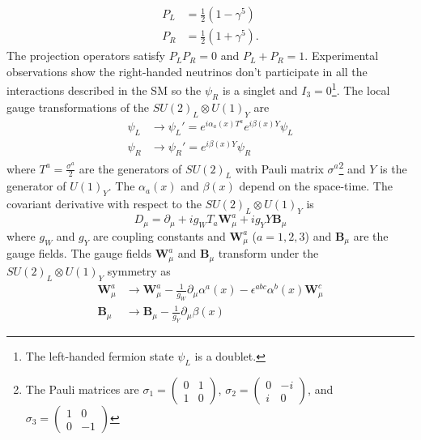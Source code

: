 %
\begin{align}
    P_{L} & = \frac{1}{2} (1 - \gamma^{5})\\
    P_{R} & = \frac{1}{2} (1 + \gamma^{5}).
    \label{eq:sm_projection_operators}
\end{align}
%
The projection operators satisfy $P_{L}P_{R} = 0$ and $P_{L} + P_{R} = 1$.
Experimental observations show the right-handed neutrinos don't participate in all the interactions described in the SM so the $\psi_{R}$ is a singlet and $I_{3} = 0$\footnote{The left-handed fermion state $\psi_{L}$ is a doublet.}.
The local gauge transformations of the $SU(2)_{L} \otimes U(1)_{Y}$ are
%
\begin{align}
    \psi_{L} & \rightarrow \psi_{L}' = e^{i \alpha_{a}(x) T^{a}}e^{i \beta(x) Y} \psi_{L}\\
    \psi_{R} & \rightarrow \psi_{R}' = e^{i \beta(x) Y} \psi_{R}
    \label{eq:sm_local_gauge_transformations_ew_1}
\end{align}
%
where $T^{a} = \frac{\sigma^{a}}{2}$ are the generators of $SU(2)_{L}$ with Pauli matrix $\sigma^{a}$\footnote{The Pauli matrices are $\sigma_{1}=\left(\begin{matrix}0 & 1\\1 & 0\end{matrix}\right)$, $\sigma_{2}=\left(\begin{matrix}0 & -i\\i & 0\end{matrix}\right)$, and $\sigma_{3}=\left(\begin{matrix}1 & 0\\0 & -1\end{matrix}\right)$} and $Y$ is the generator of $U(1)_{Y}$.
The $\alpha_{a}(x)$ and $\beta(x)$ depend on the space-time.
The covariant derivative with respect to the $SU(2)_{L} \otimes U(1)_{Y}$ is
%
\begin{equation}
    D_{\mu} = \partial_{\mu} + i g_{W} T_{a} \bm{W}_{\mu}^{a} + i g_{Y} Y \bm{B}_{\mu}
    \label{eq:sm_derivative_ew}
\end{equation}
%
where $g_{W}$ and $g_{Y}$ are coupling constants and $\bm{W}_{\mu}^{a}$ ($a = 1, 2, 3$) and $\bm{B}_{\mu}$ are the gauge fields.
The gauge fields $\bm{W}_{\mu}^{a}$ and $\bm{B}_{\mu}$ transform under the $SU(2)_{L} \otimes U(1)_{Y}$ symmetry as
%
\begin{align}
    \bm{W}_{\mu}^{a} & \rightarrow \bm{W}_{\mu}^{a} - \frac{1}{g_{W}} \partial_{\mu} \alpha^{a}(x) - \epsilon^{abc} \alpha^{b}(x) \bm{W}_{\mu}^{c}\\
    \bm{B}_{\mu} & \rightarrow \bm{B}_{\mu} - \frac{1}{g_{Y}} \partial_{\mu} \beta(x)
    \label{eq:sm_local_gauge_transformations_ew_2}
\end{align}
